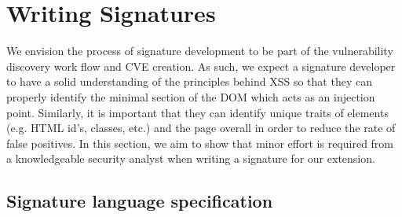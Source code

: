 \section{Writing Signatures}

We envision the process of signature development to be part of the vulnerability discovery work flow and CVE creation. As such, we expect a signature developer to have a solid understanding of the principles behind XSS so that they can properly identify the minimal section of the DOM which acts as an injection point. Similarly, it is important that they can identify unique traits of elements (e.g. HTML id's, classes, etc.) and the page overall in order to reduce the rate of false positives. In this section, we aim to show that minor effort is required from a knowledgeable security analyst when writing a signature for our extension.

\subsection{Signature language specification} 

